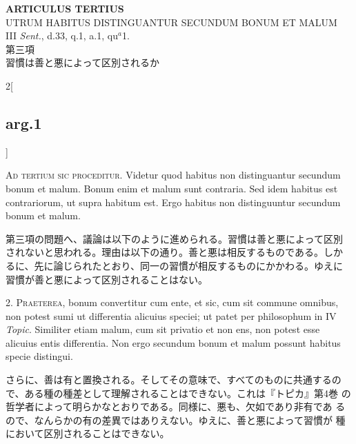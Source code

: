 \documentclass[paper=a4paper,fontsize=10pt,jafontsize=9pt,titlepage]{jlreq}
\begin{document}
\begin{center}
{\Large {\bfseries ARTICULUS TERTIUS}}\\
{\large UTRUM HABITUS DISTINGUANTUR SECUNDUM BONUM ET MALUM}\\
{\footnotesize III {\itshape Sent.}, d.33, q.1, a.1, qu$^{a}$1.}\\
{\Large 第三項\\習慣は善と悪によって区別されるか}
\end{center}

\begin{paracol}{2}[\subsection{arg.1}]

{\scshape Ad tertium sic proceditur}. Videtur quod habitus non
distinguantur secundum bonum et malum. Bonum enim et malum sunt
contraria. Sed idem habitus est contrariorum, ut supra habitum
est. Ergo habitus non distinguuntur secundum bonum et malum.

\switchcolumn

第三項の問題へ、議論は以下のように進められる。習慣は善と悪によって区別
されないと思われる。理由は以下の通り。善と悪は相反するものである。しか
るに、先に論じられたとおり、同一の習慣が相反するものにかかわる。ゆえに
習慣が善と悪によって区別されることはない。


2. {\scshape Praeterea}, bonum convertitur cum ente, et sic, cum sit
commune omnibus, non potest sumi ut differentia alicuius speciei; ut
patet per philosophum in IV {\itshape Topic}. Similiter etiam malum,
cum sit privatio et non ens, non potest esse alicuius entis
differentia. Non ergo secundum bonum et malum possunt habitus specie
distingui.

\switchcolumn

さらに、善は有と置換される。そしてその意味で、すべてのものに共通するの
で、ある種の種差として理解されることはできない。これは『トピカ』第4巻
の哲学者によって明らかなとおりである。同様に、悪も、欠如であり非有であ
るので、なんらかの有の差異ではありえない。ゆえに、善と悪によって習慣が
種において区別されることはできない。



\end{paracol}
\end{document}
